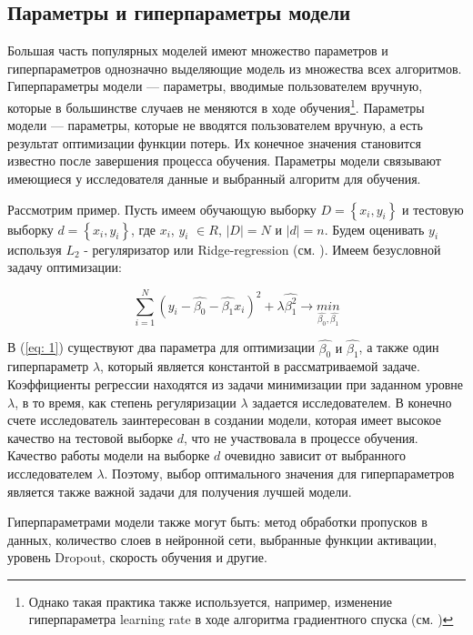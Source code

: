 \documentclass[a4paper, 14pt]{article}
\begin{document}
\subsection{Параметры и гиперпараметры модели}
Большая часть популярных моделей имеют множество параметров и гиперпараметров однозначно выделяющие модель из множества всех алгоритмов. Гиперпараметры модели --- параметры, вводимые пользователем вручную, которые в большинстве случаев не меняются в ходе обучения\footnote{Однако такая практика также используется, например, изменение гиперпараметра  learning rate в ходе алгоритма градиентного спуска (см. \cite{zeiler2012adadelta})}. Параметры модели --- параметры, которые не вводятся пользователем вручную, а есть результат оптимизации функции потерь. Их конечное значения становится известно после завершения процесса обучения. Параметры модели связывают имеющиеся у исследователя данные и выбранный алгоритм для обучения. 

Рассмотрим пример. Пусть имеем обучающую выборку $D = \left\{x_i, y_i\right\}$ и тестовую выборку $d = \left\{x_i, y_i\right\}$, где $x_i$, $y_i$ $\in R$, $\left|D\right| = N$ и $\left|d\right| = n$. Будем оценивать $y_i$ используя $L_2$ - регуляризатор или Ridge-regression (см. \cite{hoerl1970ridge}). Имеем безусловной задачу оптимизации:


\begin{equation} 
\label{ridge} %
\sum_{i=1}^{N} (y_i - \hat{\beta_0} - \hat{\beta_1} x_i)^2 + \lambda \hat{\beta_1^2} \rightarrow \underset{\hat{\beta_0}, \hat{\beta_1}}{min}
\end{equation} 

В (\ref{eq: 1}) существуют два параметра для оптимизации $\hat{\beta_0} \text{ и } \hat{\beta_1}$, а также один гиперпараметр $\lambda$, который является константой в рассматриваемой задаче. Коэффициенты регрессии находятся из задачи минимизации при заданном уровне $\lambda$, в то время, как степень регуляризации $\lambda$ задается исследователем. В конечно счете исследователь заинтересован в создании модели, которая имеет высокое качество на тестовой выборке $d$, что не участвовала в процессе обучения. Качество работы модели на выборке $d$ очевидно зависит от выбранного исследователем $\lambda$. Поэтому, выбор оптимального значения для гиперпараметров является также важной задачи для получения лучшей модели.

Гиперпараметрами модели также могут быть: метод обработки пропусков в данных, количество слоев в нейронной сети, выбранные функции активации, уровень Dropout, скорость обучения и другие. 
\end{document}
